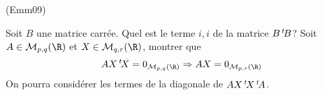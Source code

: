 \begin{tiny}(Emm09)\end{tiny} Soit $B$ une matrice carrée. Quel est le terme $i,i$ de la matrice $B\,\mathstrut^t\! B$?\newline
Soit $A\in \mathcal M_{p,q}(\R)$ et $X\in \mathcal M_{q,r}(\R)$, montrer que
\begin{displaymath}
 AX\,\mathstrut^t\!X=0_{\mathcal M_{p,q}(\R)}\Rightarrow AX=0_{\mathcal M_{p,r}(\R)}
\end{displaymath}
On pourra considérer les termes de la diagonale de $AX\,\mathstrut^t\!X\,\mathstrut^t\!A$.
